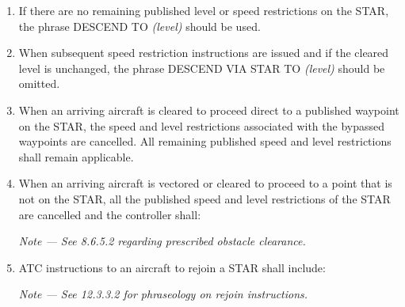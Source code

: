 \documentclass[../main.tex]{subfiles}
\begin{document}
\begin{enumerate}[itemsep=0.2cm]
\begin{enumerate}
            \item If there are no remaining published level or speed restrictions on the STAR, the phrase DESCEND TO \textit{(level)} should be used.
            \item When subsequent speed restriction instructions are issued and if the cleared level is unchanged, the phrase DESCEND VIA STAR TO \textit{(level)} should be omitted.
            \item When an arriving aircraft is cleared to proceed direct to a published waypoint on the STAR, the speed and level restrictions associated with the bypassed waypoints are cancelled. All remaining published speed and level restrictions shall remain applicable.
            \item \label{6.5.2.4.5} When an arriving aircraft is vectored or cleared to proceed to a point that is not on the STAR, all the published speed and level restrictions of the STAR are cancelled and the controller shall:

            
            \textit{Note --- See 8.6.5.2 regarding prescribed obstacle clearance.}

            \item ATC instructions to an aircraft to rejoin a STAR shall include:

            
            \textit{Note --- See 12.3.3.2 for phraseology on rejoin instructions.}
        \end{enumerate}        
    \end{enumerate}
\end{document}
